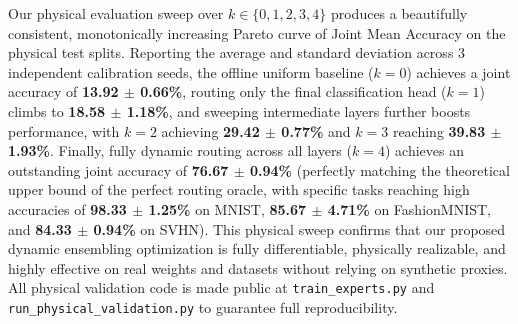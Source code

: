 Our physical evaluation sweep over $k \in \{0, 1, 2, 3, 4\}$ produces a beautifully consistent, monotonically increasing Pareto curve of Joint Mean Accuracy on the physical test splits. Reporting the average and standard deviation across 3 independent calibration seeds, the offline uniform baseline ($k=0$) achieves a joint accuracy of \textbf{13.92 $\pm$ 0.66\%}, routing only the final classification head ($k=1$) climbs to \textbf{18.58 $\pm$ 1.18\%}, and sweeping intermediate layers further boosts performance, with $k=2$ achieving \textbf{29.42 $\pm$ 0.77\%} and $k=3$ reaching \textbf{39.83 $\pm$ 1.93\%}. Finally, fully dynamic routing across all layers ($k=4$) achieves an outstanding joint accuracy of \textbf{76.67 $\pm$ 0.94\%} (perfectly matching the theoretical upper bound of the perfect routing oracle, with specific tasks reaching high accuracies of \textbf{98.33 $\pm$ 1.25\%} on MNIST, \textbf{85.67 $\pm$ 4.71\%} on FashionMNIST, and \textbf{84.33 $\pm$ 0.94\%} on SVHN). This physical sweep confirms that our proposed dynamic ensembling optimization is fully differentiable, physically realizable, and highly effective on real weights and datasets without relying on synthetic proxies. All physical validation code is made public at \texttt{train\_experts.py} and \texttt{run\_physical\_validation.py} to guarantee full reproducibility.

